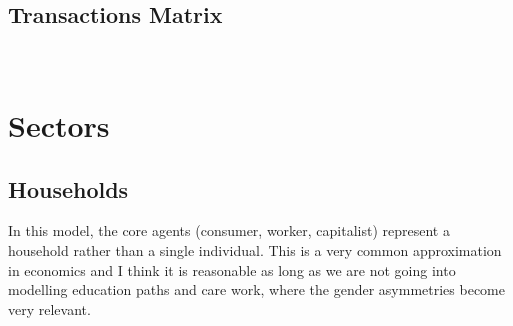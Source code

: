 \documentclass[a4paper, headings=standardclasses]{scrartcl}
\begin{document}
\subsection{Transactions Matrix}
\\

\section{Sectors}
\subsection{Households}
In this model, the core agents (consumer, worker, capitalist) represent a household rather than a single individual. This is a very common approximation in economics and I think it is reasonable as long as we are not going into modelling education paths and care work, where the gender asymmetries become very relevant.
\end{document}
